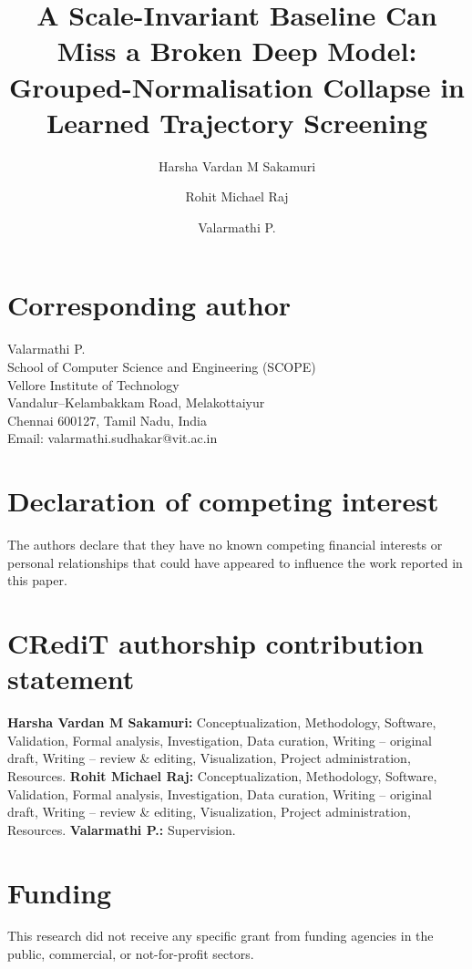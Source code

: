 \documentclass[preprint,12pt,authoryear]{elsarticle}
\begin{document}
\begin{frontmatter}

\title{A Scale-Invariant Baseline Can Miss a Broken Deep Model: Grouped-Normalisation Collapse in Learned Trajectory Screening}

\author[inst1]{Harsha Vardan M Sakamuri}
\author[inst1]{Rohit Michael Raj}
\author[inst1]{Valarmathi P.}

\end{frontmatter}

\section*{Corresponding author}
Valarmathi P.\\
School of Computer Science and Engineering (SCOPE)\\
Vellore Institute of Technology\\
Vandalur--Kelambakkam Road, Melakottaiyur\\
Chennai 600127, Tamil Nadu, India\\
Email: valarmathi.sudhakar@vit.ac.in

\section*{Declaration of competing interest}
The authors declare that they have no known competing financial interests or personal relationships that could have appeared to influence the work reported in this paper.

\section*{CRediT authorship contribution statement}
\textbf{Harsha Vardan M Sakamuri:} Conceptualization, Methodology, Software, Validation, Formal analysis, Investigation, Data curation, Writing -- original draft, Writing -- review \& editing, Visualization, Project administration, Resources.
\textbf{Rohit Michael Raj:} Conceptualization, Methodology, Software, Validation, Formal analysis, Investigation, Data curation, Writing -- original draft, Writing -- review \& editing, Visualization, Project administration, Resources.
\textbf{Valarmathi P.:} Supervision.

\section*{Funding}
This research did not receive any specific grant from funding agencies in the public, commercial, or not-for-profit sectors.
\end{document}
